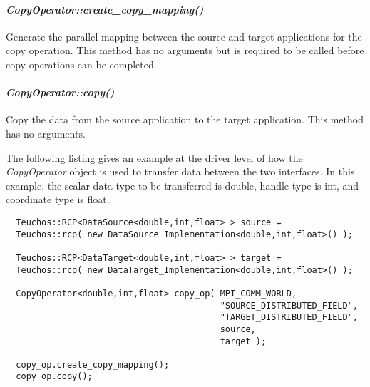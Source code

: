 \documentclass[letterpaper]{article}
\begin{document}
\paragraph{\sl CopyOperator::create\_copy\_mapping()}
Generate the parallel mapping between the source and target
applications for the copy operation. This method has no arguments but
is required to be called before copy operations can be completed.

\paragraph{\sl CopyOperator::copy()}
Copy the data from the source application to the target
application. This method has no arguments.

The following listing gives an example at the driver level of how the
{\sl CopyOperator} object is used to transfer data between the two
interfaces. In this example, the scalar data type to be transferred is
double, handle type is int, and coordinate type is float.

\begin{lstlisting}
  Teuchos::RCP<DataSource<double,int,float> > source = 
  Teuchos::rcp( new DataSource_Implementation<double,int,float>() );

  Teuchos::RCP<DataTarget<double,int,float> > target = 
  Teuchos::rcp( new DataTarget_Implementation<double,int,float>() );

  CopyOperator<double,int,float> copy_op( MPI_COMM_WORLD, 
                                          "SOURCE_DISTRIBUTED_FIELD",
                                          "TARGET_DISTRIBUTED_FIELD",
                                          source, 
                                          target ); 
                                         
  copy_op.create_copy_mapping();
  copy_op.copy();
\end{lstlisting}

\end{document}
